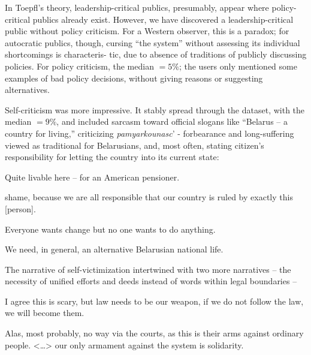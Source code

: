 In Toepfl’s theory, leadership-critical publics, presumably, appear where policy-critical publics already exist. However, we have discovered a leadership-critical public without policy criticism. For a Western observer, this is a paradox; for autocratic publics, though, cursing “the system” without assessing its individual shortcomings is characteris- tic, due to absence of traditions of publicly discussing policies. For policy criticism, the median \(= 5\%\); the users only mentioned some examples of bad policy decisions, without giving reasons or suggesting alternatives.

Self-criticism was more impressive. It stably spread through the dataset, with the median \(= 9\%\), and included sarcasm toward official slogans like “Belarus -- a country for living,” criticizing \textit{pamyarkounasc}’ - forbearance and long-suffering viewed as traditional for Belarusians, and, most often, stating citizen’s responsibility for letting the country into its current state:

\begin{displayquote}
	Quite livable here -- for an American pensioner.
\end{displayquote}

\begin{displayquote}
	[I feel] shame, because we are all responsible that our country is ruled by exactly this [person].
\end{displayquote}

\begin{displayquote}
	Everyone wants change but no one wants to do anything.
\end{displayquote}

\begin{displayquote}
	We need, in general, an alternative Belarusian national life.
\end{displayquote}

The narrative of self-victimization intertwined with two more narratives -- the necessity of unified efforts and deeds instead of words within legal boundaries -- 

\begin{displayquote}
	I agree this is scary, but law needs to be our weapon, if we do not follow the law, we will become them.
\end{displayquote}

\begin{displayquote}
	Alas, most probably, no way via the courts, as this is their arms against ordinary people. <…> our only armament against the system is solidarity.
\end{displayquote}

